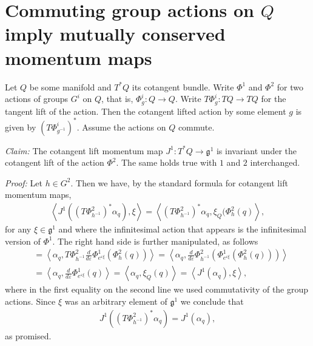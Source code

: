 \documentclass[12pt]{amsart}
\begin{document}
\thispagestyle{empty}
\section*{{\bf Commuting group actions on $Q$ imply mutually conserved momentum maps}}

Let $Q$ be some manifold and $T^*Q$ its cotangent bundle. Write $\Phi^1$ and $\Phi^2$ for two actions of groups $G^i$ on $Q$, that is, $\Phi^i_g: Q \to Q$. Write $T\Phi^i_g: TQ \to TQ$ for the tangent lift of the action. Then the cotangent lifted action by some element $g$ is given by $(T\Phi^i_{g^{-1}})^*$. Assume the actions on $Q$ commute. 

\noindent \emph{Claim:} The cotangent lift momentum map $J^1: T^*Q \to \mathfrak{g}^1$ is invariant under the cotangent lift of the action $\Phi^2$. The same holds true with $1$ and $2$ interchanged.

\noindent \emph{Proof:} Let $h \in G^2$. Then we have, by the standard formula for cotangent lift momentum maps,
\begin{align}
	\left<J^1( (T\Phi^2_{h^{-1}})^* \alpha_q), \xi \right> = \left< (T\Phi^2_{h^{-1}})^* \alpha_q, \xi_Q( \Phi^2_h(q)\right>,
\end{align}
for any $\xi \in \mathfrak{g}^1$ and 
where the infinitesimal action that appears is the infinitesimal version of $\Phi^1$. The right hand side is further manipulated, as follows
\begin{align}
	&= \left<\alpha_q, T\Phi^2_{h^{-1}} \frac{d}{d\varepsilon}\Phi^1_{e^{\varepsilon \xi}}(\Phi_h^2 (q)) \right> =  \left<\alpha_q,  \frac{d}{d\varepsilon} \Phi^2_{h^{-1}} (\Phi^1_{e^{\varepsilon \xi}} (\Phi_h^2 (q)) )\right> \\
	&= \left<\alpha_q, \frac{d}{d\varepsilon} \Phi^1_{e^{\varepsilon \xi}}(q) \right> = \left<\alpha_q, \xi_Q(q) \right> = \left<J^1(\alpha_q), \xi\right>,
\end{align}
where in the first equality on the second line we used commutativity of the group actions. Since $\xi$ was an arbitrary element of $\mathfrak{g}^1$ we conclude that
\begin{align}
	J^1( (T\Phi^2_{h^{-1}})^* \alpha_q) = J^1(\alpha_q),
\end{align}
as promised.
\end{document}
